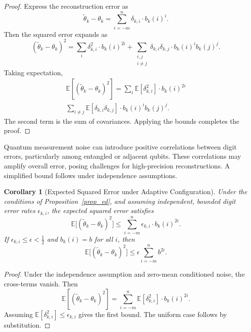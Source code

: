 \documentclass[aps,twocolumn,superscriptaddress,nofootinbib]{revtex4}
\newtheorem{corollary}{Corollary}
\begin{document}
\begin{proof}
Express the reconstruction error as
\[
\tilde{\theta}_k - \theta_k = \sum_{i = -m}^{n} \delta_{k,i} \cdot b_k(i)^i.
\]
Then the squared error expands as
\[
(\tilde{\theta}_k - \theta_k)^2 
= \sum_{i} \delta_{k,i}^2 \cdot b_k(i)^{2i} 
+ \sum_{\substack{i,j \\ i \neq j}} \delta_{k,i} \delta_{k,j} \cdot b_k(i)^i b_k(j)^j.
\]
Taking expectation,
\begin{multline}
\mathbb{E}[(\tilde{\theta}_k - \theta_k)^2] 
= \sum_i \mathbb{E}[\delta_{k,i}^2] \cdot b_k(i)^{2i} 
\\
 \sum_{i \neq j} \mathbb{E}[\delta_{k,i} \delta_{k,j}] \cdot b_k(i)^i b_k(j)^j.
\end{multline}
The second term is the sum of covariances. Applying the bounds completes the proof.
\end{proof}

Quantum measurement noise can introduce positive correlations between digit errors, particularly among entangled or adjacent qubits. These correlations may amplify overall error, posing challenges for high-precision reconstructions. A simplified bound follows under independence assumptions.

\begin{corollary}[Expected Squared Error under Adaptive Configuration]\label{cor:adaptive_config}
Under the conditions of Proposition~\ref{prop_ed}, and assuming independent, bounded digit error rates \( \epsilon_{k,i} \), the expected squared error satisfies
\begin{equation}
\mathbb{E}\big[(\tilde{\theta}_k - \theta_k)^2\big] 
\leq \sum_{i=-m}^{n} \epsilon_{k,i} \cdot b_k(i)^{2i}.
\end{equation}
If \( \epsilon_{k,i} \leq \epsilon < \tfrac{1}{2} \) and \( b_k(i) = b \) for all $i$, then
\begin{equation}
\mathbb{E}\big[(\tilde{\theta}_k - \theta_k)^2\big] 
\leq \epsilon \sum_{i=-m}^{n} b^{2i}.
\end{equation}
\end{corollary}

\begin{proof}
Under the independence assumption and zero-mean conditioned noise, the cross-terms vanish. Then
\[
\mathbb{E}[(\tilde{\theta}_k - \theta_k)^2] 
= \sum_{i=-m}^{n} \mathbb{E}[\delta_{k,i}^2] \cdot b_k(i)^{2i}.
\]
Assuming \( \mathbb{E}[\delta_{k,i}^2] \leq \epsilon_{k,i} \) gives the first bound. The uniform case follows by substitution.
\end{proof}
\end{document}
